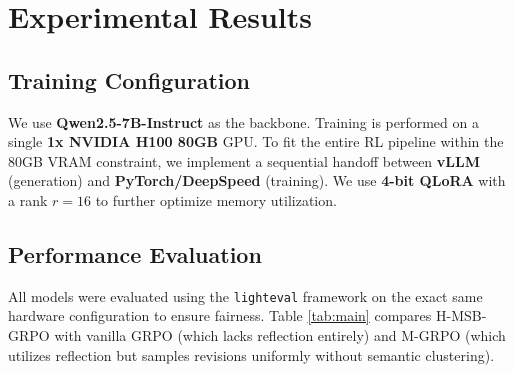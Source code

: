 \documentclass[letterpaper]{article}
\begin{document}
\section{Experimental Results}

\subsection{Training Configuration}
We use \textbf{Qwen2.5-7B-Instruct} as the backbone. Training is performed on a single \textbf{1x NVIDIA H100 80GB} GPU. To fit the entire RL pipeline within the 80GB VRAM constraint, we implement a sequential handoff between \textbf{vLLM} (generation) and \textbf{PyTorch/DeepSpeed} (training). We use \textbf{4-bit QLoRA} with a rank $r=16$ to further optimize memory utilization.

\subsection{Performance Evaluation}
All models were evaluated using the \texttt{lighteval} framework on the exact same hardware configuration to ensure fairness. Table \ref{tab:main} compares H-MSB-GRPO with vanilla GRPO (which lacks reflection entirely) and M-GRPO (which utilizes reflection but samples revisions uniformly without semantic clustering).

\begin{table}[ht]
\centering
\caption{Pass@1 Accuracy (\%) on Reasoning Benchmarks.}
\label{tab:main}
\end{table}
\end{document}
